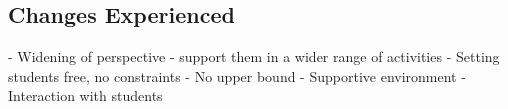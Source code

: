 











\subsection{Changes Experienced} %
\label{sub:changes_experienced}

- Widening of perspective - support them in a wider range of activities
- Setting students free, no constraints
- No upper bound
- Supportive environment
- Interaction with students

